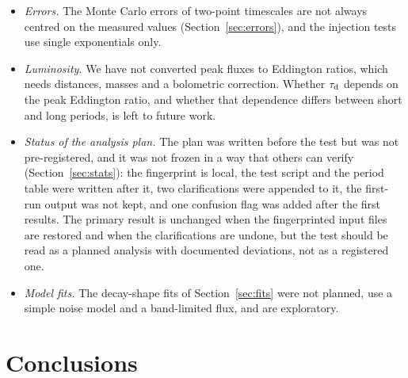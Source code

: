 \documentclass[fleqn,usenatbib]{mnras}
\newcommand{\taud}{\tau_{\rm d}}
\begin{document}
\begin{itemize}
\item \textit{Errors.} The Monte Carlo errors of two-point timescales are not always centred on the measured values (Section~\ref{sec:errors}), and the injection tests use single exponentials only.
\item \textit{Luminosity.} We have not converted peak fluxes to Eddington ratios, which needs distances, masses and a bolometric correction. Whether $\taud$ depends on the peak Eddington ratio, and whether that dependence differs between short and long periods, is left to future work.
\item \textit{Status of the analysis plan.} The plan was written before the test but was not pre-registered, and it was not frozen in a way that others can verify (Section~\ref{sec:stats}): the fingerprint is local, the test script and the period table were written after it, two clarifications were appended to it, the first-run output was not kept, and one confusion flag was added after the first results. The primary result is unchanged when the fingerprinted input files are restored and when the clarifications are undone, but the test should be read as a planned analysis with documented deviations, not as a registered one.
\item \textit{Model fits.} The decay-shape fits of Section~\ref{sec:fits} were not planned, use a simple noise model and a band-limited flux, and are exploratory.
\end{itemize}

\section{Conclusions}
\label{sec:conclusions}
\end{document}
